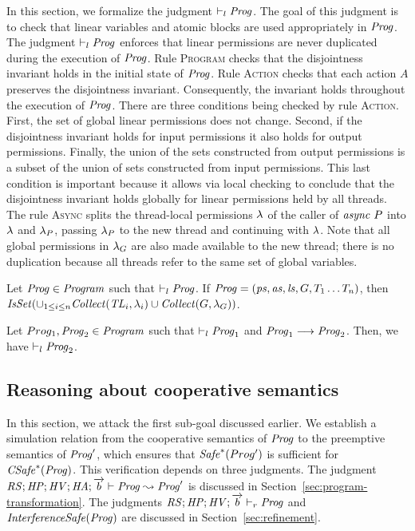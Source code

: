 In this section, we formalize the judgment $\vdash_l \mathit{Prog}$.
The goal of this judgment is to check that
linear variables and atomic blocks are used appropriately in $\mathit{Prog}$.
The judgment $\vdash_l \mathit{Prog}$ enforces that linear permissions are never duplicated during the 
execution of $\mathit{Prog}$.
Rule \textsc{Program} checks that the disjointness invariant holds in the initial state of $\mathit{Prog}$.
Rule \textsc{Action} checks that each action $A$ preserves the disjointness invariant.
Consequently, the invariant holds throughout the execution of $\mathit{Prog}$.
There are three conditions being checked by rule \textsc{Action}.
First, the set of global linear permissions does not change.
Second, if the disjointness invariant holds for input permissions it also holds for output permissions.
Finally, the union of the sets constructed from output permissions is a subset of the union of sets
constructed from input permissions.  
This last condition is important because it allows via local checking to conclude that the disjointness invariant holds globally
for linear permissions held by all threads.
The rule \textsc{Async} splits the thread-local permissions $\lambda$ of the caller of $\mathit{async}\ P$ into $\lambda$ 
and $\lambda_P$, passing $\lambda_P$ to the new thread and continuing with $\lambda$.
Note that all global permissions in $\lambda_G$ are also made available to the new thread;
there is no duplication because all threads refer to the same set of global variables.

\begin{lemma}
Let $\mathit{Prog} \in \mathit{Program}$ such that $\vdash_l \mathit{Prog}$.
If $\mathit{Prog} = (\mathit{ps}, \mathit{as}, \mathit{ls}, G, T_1 \ldots T_n)$, 
then $\mathit{IsSet}(\cup_{1 \le i \le n} \mathit{Collect}(\mathit{TL}_i, \lambda_i) \cup \mathit{Collect}(G, \lambda_G))$.
\end{lemma}

\begin{lemma}
Let $Prog_1, \mathit{Prog}_2 \in \mathit{Program}$ such that $\vdash_l \mathit{Prog}_1$ and $\mathit{Prog}_1 \longrightarrow \mathit{Prog}_2$.
Then, we have $\vdash_l \mathit{Prog}_2$.
\end{lemma}

\subsection{Reasoning about cooperative semantics}
In this section, we attack the first sub-goal discussed earlier.
We establish a simulation relation from the cooperative semantics of $\mathit{Prog}$ 
to the preemptive semantics of $\mathit{Prog}'$, which ensures that $\mathit{Safe}^*(Prog')$ is sufficient for $\mathit{CSafe}^*(\mathit{Prog})$.
This verification depends on three judgments.
The judgment $\mathit{RS};\mathit{HP};\mathit{HV};\mathit{HA};\overrightarrow{b} \vdash \mathit{Prog} \leadsto \mathit{Prog}'$ is discussed in 
Section~\ref{sec:program-transformation}.
The judgments $\mathit{RS};\mathit{HP};\mathit{HV};\overrightarrow{b} \vdash_r \mathit{Prog}$ and $\mathit{InterferenceSafe}(\mathit{Prog})$
are discussed in Section~\ref{sec:refinement}.

